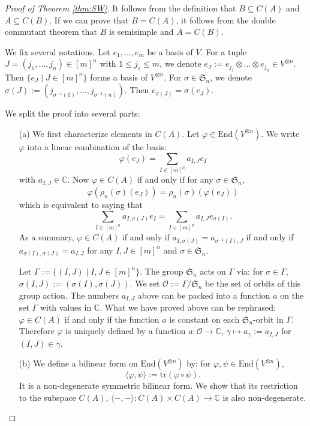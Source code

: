 \documentclass[twoside = false,	%
		headsepline,		%
		parskip = true,
		]{scrbook}						%
\begin{document}
        \begin{proof}[Proof of Theorem \ref{thm:SW}]
            It follows from the definition that $B\subseteq C(A)$ and $A\subseteq C(B)$. If we can prove that $B=C(A)$, it follows from the double commutant theorem that $B$ is semisimple and $A=C(B)$.
        
            We fix several notations. Let $e_1,\ldots,e_m$ be a basis of $V$. For a tuple $J=(j_1,\ldots,j_n)\in [m]^n$ with $1\leq j_s\leq m$, we denote $e_J:=e_{j_1}\otimes\ldots\otimes e_{j_n}\in V^{\otimes n}$. Then $\{e_J\mid J\in[m]^n\}$ forms a basis of $V^{\otimes n}$. For $\sigma\in\mathfrak{S}_n$, we denote $\sigma(J):=(j_{\sigma^{-1}(1)},\ldots,j_{\sigma^{-1}(n)})$. Then $e_{\sigma(J)}=\sigma(e_J)$.
        
            We split the proof into several parts:
            \begin{enumerate}
            \item[(a)] We first characterize elements in $C(A)$. Let $\varphi\in \mathrm{End}(V^{\otimes n})$. We write $\varphi$ into a linear combination of the basis:
            $$\varphi(e_J)=\sum_{I\in[m]^n}a_{I,J}e_I$$
            with $a_{I,J}\in\mathbb{C}$. Now $\varphi\in C(A)$ if and only if for any $\sigma\in \mathfrak{S}_n$, 
            $$\varphi(\rho_n(\sigma)(e_J))=\rho_n(\sigma)(\varphi(e_J))$$
            which is equivalent to saying that 
            $$\sum_{I\in [m]^n}a_{I,\sigma(J)}e_I=\sum_{I\in [m]^n}a_{I,J}e_{\sigma(I)}.$$
            As a summary, $\varphi\in C(A)$ if and only if $a_{I,\sigma(J)}=a_{\sigma^{-1}(I),J}$ if and only if $a_{\sigma(I),\sigma(J)}=a_{I,J}$ for any $I,J\in[m]^n$ and $\sigma\in\mathfrak{S}_n$.
        
            Let $\Gamma:=\{(I,J)\mid I,J\in[m]^n\}$. The group $\mathfrak{S}_n$ acts on $\Gamma$ via: for $\sigma\in\Gamma$, $\sigma(I,J):=(\sigma(I),\sigma(J))$. We set $\mathcal{O}:=\Gamma/\mathfrak{S}_n$ be the set of orbits of this group action. The numbers $a_{I,J}$ above can be packed into a function $a$ on the set $\Gamma$ with values in $\mathbb{C}$. What we have proved above can be rephrased: $\varphi\in C(A)$ if and only if the function $a$ is constant on each $\mathfrak{S}_n$-orbit in $\Gamma$. Therefore $\varphi$ is uniquely defined by a function $a:\mathcal{O}\to\mathbb{C}$, $\gamma\mapsto a_\gamma:=a_{I,J}$ for $(I,J)\in\gamma$.
        
            \item[(b)] We define a bilinear form on $\mathrm{End}(V^{\otimes n})$ by: for $\varphi,\psi\in\mathrm{End}(V^{\otimes n})$, 
            $$\langle\varphi,\psi\rangle:=\mathrm{tr}(\varphi\circ\psi).$$ 
            It is a non-degenerate symmetric bilinear form. We show that its restriction to the subspace $C(A)$, $\langle-,-\rangle:C(A)\times C(A)\to\mathbb{C}$ is also non-degenerate. 
        

\end{enumerate}
\end{proof}
\end{document}
